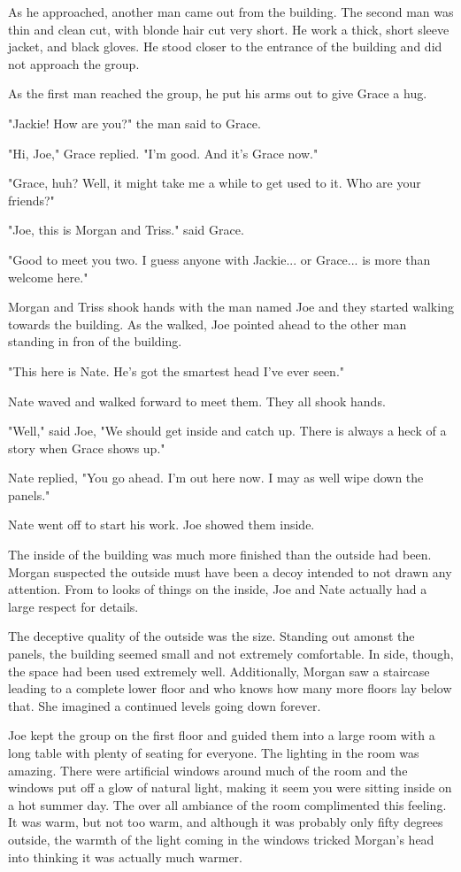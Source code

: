 \documentclass[courier]{sffms}
\begin{document}
As he approached, another man came out from the
building. The second man was thin and clean cut,
with blonde hair cut very short. He work a thick,
short sleeve jacket, and black gloves. He stood closer
to the entrance of the building and did not approach
the group.

As the first man reached the group, he put his arms
out to give Grace a hug.

"Jackie! How are you?" the man said to Grace.

"Hi, Joe," Grace replied. "I'm good. And it's Grace now."

"Grace, huh? Well, it might take me a while to get
used to it. Who are your friends?"

"Joe, this is Morgan and Triss." said Grace.

"Good to meet you two. I guess anyone with Jackie...
or Grace... is more than welcome here."

Morgan and Triss shook hands with the man named
Joe and they started walking towards the building.
As the walked, Joe pointed ahead to the other man
standing in fron of the building.

"This here is Nate. He's got the smartest head I've
ever seen."

Nate waved and walked forward to meet them. They
all shook hands.

"Well," said Joe, "We should get inside and catch up.
There is always a heck of a story when Grace shows
up."

Nate replied, "You go ahead. I'm out here now. I
may as well wipe down the panels."

Nate went off to start his work. Joe showed them inside.

The inside of the building was much more finished than
the outside had been. Morgan suspected the outside
must have been a decoy intended to not drawn any
attention. From to looks of things on the inside, Joe
and Nate actually had a large respect for details.

The deceptive quality of the outside was the size. Standing
out amonst the panels, the building seemed small
and not extremely comfortable. In side, though, the space
had been used extremely well. Additionally, Morgan saw
a staircase leading to a complete lower floor and who knows
how many more floors lay below that. She imagined a
continued levels going down forever.

Joe kept the group on the first floor and guided them into
a large room with a long table with plenty of seating for
everyone. The lighting in the room was amazing. There
were artificial windows around much of the room and
the windows put off a glow of natural light, making it
seem you were sitting inside on a hot summer day.
The over all ambiance of the room complimented this
feeling. It was warm, but not too warm, and although
it was probably only fifty degrees outside, the warmth
of the light coming in the windows tricked Morgan's
head into thinking it was actually much warmer. 
\end{document}
